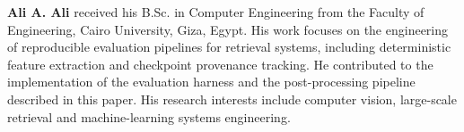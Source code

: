 \medskip\noindent\textbf{Ali A. Ali} received his B.Sc. in Computer Engineering
from the Faculty of Engineering, Cairo University, Giza, Egypt. His work
focuses on the engineering of reproducible evaluation pipelines for retrieval
systems, including deterministic feature extraction and checkpoint provenance
tracking. He contributed to the implementation of the evaluation harness and
the post-processing pipeline described in this paper. His research interests
include computer vision, large-scale retrieval and machine-learning systems
engineering.
